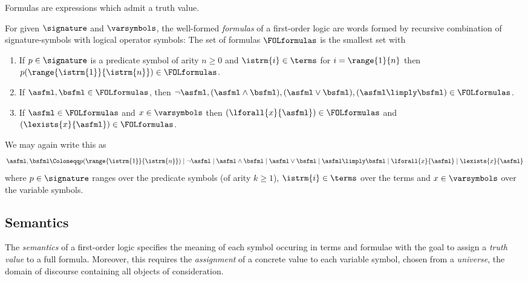             Formulas are expressions which admit a truth value.
            \begin{definition}
                For given $\signature$ and $\varsymbols$, the well-formed \emph{formulas} of a first-order logic are words formed by recursive combination of signature-symbols with logical operator symbols:
                The set of formulas $\FOLformulas$ is the smallest set with
                \begin{enumerate}
                    \item If $p\in\signature$ is a predicate symbol of arity $n\geq 0$ and $\istrm{i}\in\terms$ for $i=\range{1}{n}$ then $p(\range{\istrm{1}}{\istrm{n}})\in\FOLformulas$.
                    \item If $\asfml,\bsfml\in\FOLformulas$, then $\lnot\asfml,(\asfml\land\bsfml),(\asfml\lor\bsfml),(\asfml\limply\bsfml)\in\FOLformulas$.
                    \item If $\asfml\in\FOLformulas$ and $x\in\varsymbols$ then $(\lforall{x}{\asfml})\in\FOLformulas$ and  $(\lexists{x}{\asfml})\in\FOLformulas$.
                \end{enumerate}
                We may again write this as
                \begin{equation}
                    \asfml,\bsfml \Coloneqq
                        p(\range{\istrm{1}}{\istrm{n}}) \mid
                        \lnot\asfml \mid
                        \asfml\land\bsfml \mid
                        \asfml\lor\bsfml \mid
                        \asfml\limply\bsfml \mid
                        \lforall{x}{\asfml} \mid
                        \lexists{x}{\asfml}
                \end{equation}
                where $p\in\signature$ ranges over the predicate symbols (of arity $k\geq 1$), $\istrm{i}\in\terms$ over the terms and $x\in\varsymbols$ over the variable symbols.
            \end{definition}

        \subsection{Semantics}
            \label{sec:FOL-semantics}
            
            The \emph{semantics} of a first-order logic specifies the meaning of each symbol occuring in terms and formulae with the goal to assign a \emph{truth value} to a full formula.
            Moreover, this requires the \emph{assignment} of a concrete value to each variable symbol, chosen from a \emph{universe}, the domain of discourse containing all objects of consideration.

